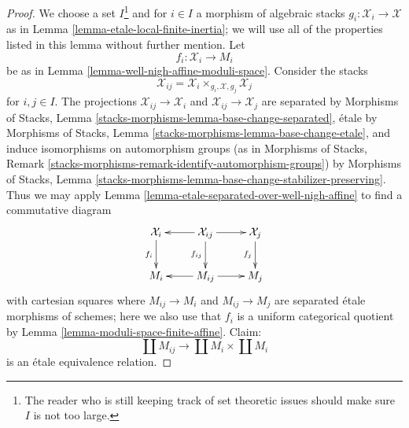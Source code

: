 \documentclass[10pt,a4paper]{amsart}
\theoremstyle{plain}
\theoremstyle{definition}
\theoremstyle{remark}
\numberwithin{equation}{subsection}
\begin{document}
\begin{proof}
We choose a set $I$\footnote{The reader who is still keeping
track of set theoretic issues should make sure $I$ is not too large.}
and for $i \in I$ a morphism of algebraic stacks
$g_i : \mathcal{X}_i \to \mathcal{X}$ as in
Lemma \ref{lemma-etale-local-finite-inertia}; we will use all
of the properties listed in this lemma without further mention.
Let
$$
f_i : \mathcal{X}_i \to M_i
$$
be as in Lemma \ref{lemma-well-nigh-affine-moduli-space}.
Consider the stacks
$$
\mathcal{X}_{ij} = \mathcal{X}_i \times_{g_i, \mathcal{X}, g_j} \mathcal{X}_j
$$
for $i, j \in I$. The projections $\mathcal{X}_{ij} \to \mathcal{X}_i$
and $\mathcal{X}_{ij} \to \mathcal{X}_j$ are separated
by Morphisms of Stacks, Lemma
\ref{stacks-morphisms-lemma-base-change-separated},
\'etale by Morphisms of Stacks, Lemma
\ref{stacks-morphisms-lemma-base-change-etale},
and induce isomorphisms on automorphism groups
(as in Morphisms of Stacks, Remark
\ref{stacks-morphisms-remark-identify-automorphism-groups}) by
Morphisms of Stacks, Lemma
\ref{stacks-morphisms-lemma-base-change-stabilizer-preserving}.
Thus we may apply Lemma \ref{lemma-etale-separated-over-well-nigh-affine}
to find a commutative diagram
$$
\xymatrix{
\mathcal{X}_i \ar[d]_{f_i} &
\mathcal{X}_{ij} \ar[d]_{f_{ij}} \ar[l] \ar[r] &
\mathcal{X}_j \ar[d]_{f_j} \\
M_i &
M_{ij} \ar[l] \ar[r] &
M_j
}
$$
with cartesian squares where $M_{ij} \to M_i$ and $M_{ij} \to M_j$
are separated \'etale morphisms of schemes; here we also use that $f_i$
is a uniform categorical quotient by
Lemma \ref{lemma-moduli-space-finite-affine}.
Claim:
$$
\coprod M_{ij} \longrightarrow \coprod M_i \times \coprod M_i
$$
is an \'etale equivalence relation.


\end{proof}
\end{document}
